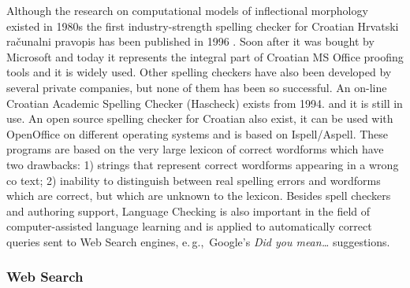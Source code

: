 \begin{multicols}{2}

Although the research on computational models of inflectional morphology existed in 1980s the first industry-strength spelling checker for Croatian Hrvatski računalni pravopis has been published in 1996 \cite{boo2}. Soon after it was bought by Microsoft and today it represents the integral part of Croatian MS Office proofing tools and it is widely used. Other spelling checkers have also been developed by several private companies, but none of them has been so successful. An on-line Croatian Academic Spelling Checker (Hascheck) \cite{str13} exists from 1994. and it is still in use. An open source spelling checker for Croatian also exist, it can be used with OpenOffice on different operating systems and is based on Ispell/Aspell. These programs are based on the very large lexicon of correct wordforms which have two drawbacks: 1) strings that represent correct wordforms appearing in a wrong co text; 2) inability to distinguish between real spelling errors and wordforms which are correct, but which are unknown to the lexicon. Besides spell checkers and authoring support, Language Checking is also important in the field of computer-assisted language learning and is applied to automatically correct queries sent to Web Search engines, e.\,g.,~Google’s \textit{Did you mean…} suggestions. 

\subsubsection{Web Search}


\end{multicols}
